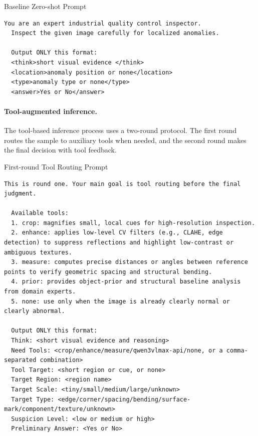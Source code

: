 \documentclass{article}
\begin{document}
{  \begin{promptbox}{Baseline Zero-shot Prompt}
  \begin{lstlisting}[style=promptstyle]
  You are an expert industrial quality control inspector.
  Inspect the given image carefully for localized anomalies.
  
  Output ONLY this format:
  <think>short visual evidence </think>
  <location>anomaly position or none</location>
  <type>anomaly type or none</type>
  <answer>Yes or No</answer>
  \end{lstlisting}
  \end{promptbox}

  

  \paragraph{Tool-augmented inference.}
  The tool-based inference process uses a two-round protocol. The first round routes the sample
  to auxiliary tools when needed, and the second round makes the final decision with tool feedback.

  \begin{promptbox}{First-round Tool Routing Prompt}
  \begin{lstlisting}[style=promptstyle]
  This is round one. Your main goal is tool routing before the final judgment.

  Available tools:
  1. crop: magnifies small, local cues for high-resolution inspection.
  2. enhance: applies low-level CV filters (e.g., CLAHE, edge detection) to suppress reflections and highlight low-contrast or ambiguous textures.
  3. measure: computes precise distances or angles between reference points to verify geometric spacing and structural bending.
  4. prior: provides object-prior and structural baseline analysis from domain experts.
  5. none: use only when the image is already clearly normal or clearly abnormal.

  Output ONLY this format:
  Think: <short visual evidence and reasoning>
  Need Tools: <crop/enhance/measure/qwen3vlmax-api/none, or a comma-separated combination>
  Tool Target: <short region or cue, or none>
  Target Region: <region name>
  Target Scale: <tiny/small/medium/large/unknown>
  Target Type: <edge/corner/spacing/bending/surface-mark/component/texture/unknown>
  Suspicion Level: <low or medium or high>
  Preliminary Answer: <Yes or No>
  \end{lstlisting}
  \end{promptbox}

}
\end{document}
